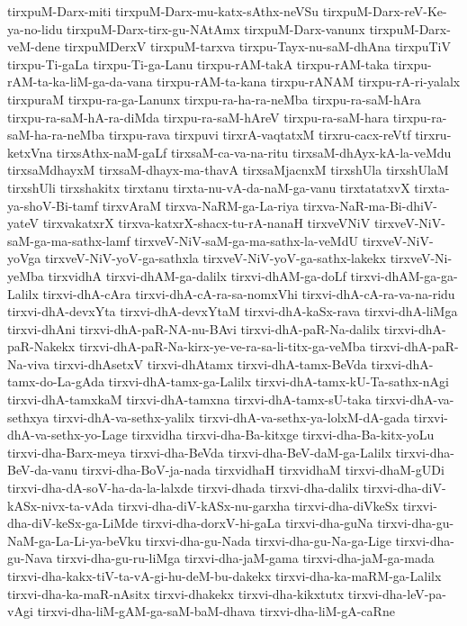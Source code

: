 {tirxpuM-Darx-miti
tirxpuM-Darx-mu-katx-sAthx-neVSu
tirxpuM-Darx-reV-Ke-ya-no-lidu
tirxpuM-Darx-tirx-gu-NAtAmx
tirxpuM-Darx-vanunx
tirxpuM-Darx-veM-dene
tirxpuMDerxV
tirxpuM-tarxva
tirxpu-Tayx-nu-saM-dhAna
tirxpuTiV
tirxpu-Ti-gaLa
tirxpu-Ti-ga-Lanu
tirxpu-rAM-takA
tirxpu-rAM-taka
tirxpu-rAM-ta-ka-liM-ga-da-vana
tirxpu-rAM-ta-kana
tirxpu-rANAM
tirxpu-rA-ri-yalalx
tirxpuraM
tirxpu-ra-ga-Lanunx
tirxpu-ra-ha-ra-neMba
tirxpu-ra-saM-hAra
tirxpu-ra-saM-hA-ra-diMda
tirxpu-ra-saM-hAreV
tirxpu-ra-saM-hara
tirxpu-ra-saM-ha-ra-neMba
tirxpu-rava
tirxpuvi
tirxrA-vaqtatxM
tirxru-cacx-reVtf
tirxru-ketxVna
tirxsAthx-naM-gaLf
tirxsaM-ca-va-na-ritu
tirxsaM-dhAyx-kA-la-veMdu
tirxsaMdhayxM
tirxsaM-dhayx-ma-thavA
tirxsaMjacnxM
tirxshUla
tirxshUlaM
tirxshUli
tirxshakitx
tirxtanu
tirxta-nu-vA-da-naM-ga-vanu
tirxtatatxvX
tirxta-ya-shoV-Bi-tamf
tirxvAraM
tirxva-NaRM-ga-La-riya
tirxva-NaR-ma-Bi-dhiV-yateV
tirxvakatxrX
tirxva-katxrX-shacx-tu-rA-nanaH
tirxveVNiV
tirxveV-NiV-saM-ga-ma-sathx-lamf
tirxveV-NiV-saM-ga-ma-sathx-la-veMdU
tirxveV-NiV-yoVga
tirxveV-NiV-yoV-ga-sathxla
tirxveV-NiV-yoV-ga-sathx-lakekx
tirxveV-Ni-yeMba
tirxvidhA
tirxvi-dhAM-ga-dalilx
tirxvi-dhAM-ga-doLf
tirxvi-dhAM-ga-ga-Lalilx
tirxvi-dhA-cAra
tirxvi-dhA-cA-ra-sa-nomxVhi
tirxvi-dhA-cA-ra-va-na-ridu
tirxvi-dhA-devxYta
tirxvi-dhA-devxYtaM
tirxvi-dhA-kaSx-rava
tirxvi-dhA-liMga
tirxvi-dhAni
tirxvi-dhA-paR-NA-nu-BAvi
tirxvi-dhA-paR-Na-dalilx
tirxvi-dhA-paR-Nakekx
tirxvi-dhA-paR-Na-kirx-ye-ve-ra-sa-li-titx-ga-veMba
tirxvi-dhA-paR-Na-viva
tirxvi-dhAsetxV
tirxvi-dhAtamx
tirxvi-dhA-tamx-BeVda
tirxvi-dhA-tamx-do-La-gAda
tirxvi-dhA-tamx-ga-Lalilx
tirxvi-dhA-tamx-kU-Ta-sathx-nAgi
tirxvi-dhA-tamxkaM
tirxvi-dhA-tamxna
tirxvi-dhA-tamx-sU-taka
tirxvi-dhA-va-sethxya
tirxvi-dhA-va-sethx-yalilx
tirxvi-dhA-va-sethx-ya-lolxM-dA-gada
tirxvi-dhA-va-sethx-yo-Lage
tirxvidha
tirxvi-dha-Ba-kitxge
tirxvi-dha-Ba-kitx-yoLu
tirxvi-dha-Barx-meya
tirxvi-dha-BeVda
tirxvi-dha-BeV-daM-ga-Lalilx
tirxvi-dha-BeV-da-vanu
tirxvi-dha-BoV-ja-nada
tirxvidhaH
tirxvidhaM
tirxvi-dhaM-gUDi
tirxvi-dha-dA-soV-ha-da-la-lalxde
tirxvi-dhada
tirxvi-dha-dalilx
tirxvi-dha-diV-kASx-nivx-ta-vAda
tirxvi-dha-diV-kASx-nu-garxha
tirxvi-dha-diVkeSx
tirxvi-dha-diV-keSx-ga-LiMde
tirxvi-dha-dorxV-hi-gaLa
tirxvi-dha-guNa
tirxvi-dha-gu-NaM-ga-La-Li-ya-beVku
tirxvi-dha-gu-Nada
tirxvi-dha-gu-Na-ga-Lige
tirxvi-dha-gu-Nava
tirxvi-dha-gu-ru-liMga
tirxvi-dha-jaM-gama
tirxvi-dha-jaM-ga-mada
tirxvi-dha-kakx-tiV-ta-vA-gi-hu-deM-bu-dakekx
tirxvi-dha-ka-maRM-ga-Lalilx
tirxvi-dha-ka-maR-nAsitx
tirxvi-dhakekx
tirxvi-dha-kikxtutx
tirxvi-dha-leV-pa-vAgi
tirxvi-dha-liM-gAM-ga-saM-baM-dhava
tirxvi-dha-liM-gA-caRne
}
